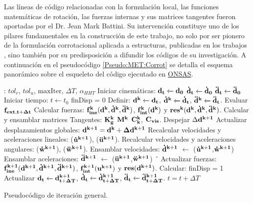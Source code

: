 Las líneas de código relacionadas con la formulación local, las funciones matemáticas de rotación, las fuerzas internas y sus matrices tangentes fueron aportadas por el Dr. Jean Mark Battini. Su intervención constituye uno de los pilares fundamentales en la construcción de este trabajo, no solo por ser pionero de la formulación corrotacional aplicada a estructuras, publicadas en los trabajos \citep{Battini2002} \citep{Le2014}, sino también por su predisposición a difundir los códigos de su investigación. A continuación en el pseudocódigo \ref{Pseudo:MET:Corrot} se detalla el esquema panorámico sobre el esqueleto del código ejecutado en \href{https://github.com/ONSAS/ONSAS.m/}{ONSAS}. 

\begin{algorithm}
	\begin{algorithmic} 
		\REQUIRE: $tol_r$, $tol_u$, $\text{maxIter}$, $\Delta T$, $\alpha_{HHT}$
		\STATE Iniciar cinemáticas: $\bf{d_t}\xleftarrow[]{}\bf{d_0}$
		$\bf{\dot{d}_t}\xleftarrow[]{}\bf{\dot{d}_0}$
		$\bf{\ddot{d}_t}\xleftarrow[]{}\bf{\ddot{d}_0}$ 
		\STATE Iniciar tiempo: $t\xleftarrow{}t_0$
		\STATE finDisp = $0$
		\STATE Definir: $\bf{d^k}\xleftarrow[]{}\bf{d_t}$, $\bf{\dot{d}^k}\xleftarrow[]{}\bf{\dot{d}_t}$, $\bf{\ddot{d}^k}\xleftarrow[]{}\bf{\ddot{d}_t}$.
		\STATE Evaluar $\bf{f_{ext,t+\Delta t}}$	
		\STATE Calcular fuerzas: $\bf{f}_{ine}^k(\bf{d}^k,\bf{\dot{d}}^k,\bf{\ddot{d}}^k)$,  $\bf{f}_{int}^k(\bf{d}^k)$ y $\bf{res}^{k}(\bf{d}^k,\bf{\dot{d}}^k,\bf{\ddot{d}}^k)$. 
		\STATE Calcular y ensamblar matrices Tangentes: $\bf{K}_g^k$ $\bf{M}^k$  $\bf{C}_k^k$, $\bf{C}_{vis}$. 
		\STATE Despejar $\Delta \bf{d}^{k+1}$ 
		\STATE Actualizar desplazamientos globales:  $\bf{d}^{k+1} = \bf{d}^{k} + \Delta\bf{d}^{k+1}$ 
		\STATE Recalcular velocidades y aceleraciones lineales: ($\bf{\dot{u}}^{k+1}$), ($\bf{\ddot{u}}^{k+1}$).
		\STATE Recalcular velocidades y aceleraciones angulares: ($\bf{\dot{w}}^{k+1}$), ($\bf{\ddot{w}}^{k+1}$).
		\STATE Ensamblar velocidades: $\bf{\dot{d}}^{k+1}$ $\leftarrow$ ($\bf{\dot{u}}^{k+1}$,$\bf{\dot{w}}^{k+1}$)
		\STATE Ensamblar aceleraciones: $\bf{\ddot{d}}^{k+1}$ $\leftarrow$ ($\bf{\ddot{u}}^{k+1}$,$\bf{\ddot{w}}^{k+1}$)
		´				\STATE Actualizar fuerzas: 	$\bf{f}_{ine}^{k+1}(\bf{d}^{k+1},\bf{\dot{d}}^{k+1},\bf{\ddot{d}}^{k+1})$,  $\bf{f}_{int}^{k+1}(\bf{u}^{k+1})$ y $\bf{res}(\bf{d}^{k+1})$. 
		\STATE Calcular: 
		\STATE finDisp = 1
		\ENDIF
		\ENDWHILE
		\STATE Actualizar $\bf{d_{t}}\xleftarrow[]{}\bf{d^{k+1}_{t+\Delta T}}$, $\bf{\dot{d}_{t}}\xleftarrow[]{}\bf{\dot{d}^{k+1}_{t+\Delta T}}$, $\bf{\ddot{d}_t}\xleftarrow[]{}\bf{\ddot{d}^{k+1}_{t+\Delta T}}$.
		\STATE $t = t+\Delta T$	
		\ENDWHILE
	\end{algorithmic}
	\caption{Pseudocódigo de iteración general. }
	\label{Pseudo:MET:Corrot}
\end{algorithm}

